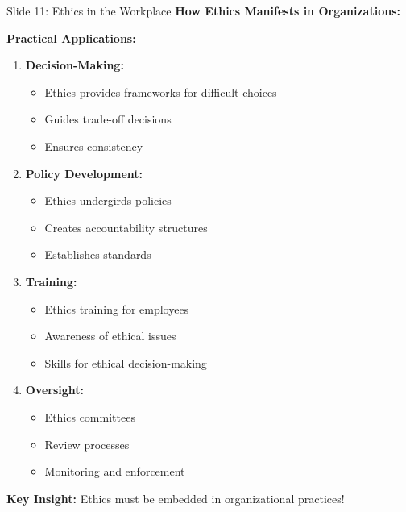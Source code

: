 \documentclass[8pt]{beamer}
\begin{document}
	\begin{frame}{Slide 11: Ethics in the Workplace}
		\fontsize{6.5}{7.5}\selectfont
		\textbf{How Ethics Manifests in Organizations:}
		
		\vspace{0.1cm}
		\textbf{Practical Applications:}
		\begin{enumerate}
			\item \textbf{Decision-Making:}
			\begin{itemize}
				\item Ethics provides frameworks for difficult choices
				\item Guides trade-off decisions
				\item Ensures consistency
			\end{itemize}
			\item \textbf{Policy Development:}
			\begin{itemize}
				\item Ethics undergirds policies
				\item Creates accountability structures
				\item Establishes standards
			\end{itemize}
			\item \textbf{Training:}
			\begin{itemize}
				\item Ethics training for employees
				\item Awareness of ethical issues
				\item Skills for ethical decision-making
			\end{itemize}
			\item \textbf{Oversight:}
			\begin{itemize}
				\item Ethics committees
				\item Review processes
				\item Monitoring and enforcement
			\end{itemize}
		\end{enumerate}
		
		\textcolor{myblue}{\textbf{Key Insight:}} Ethics must be \textcolor{myblue}{embedded in organizational practices}!
	\end{frame}
	
\end{document}
